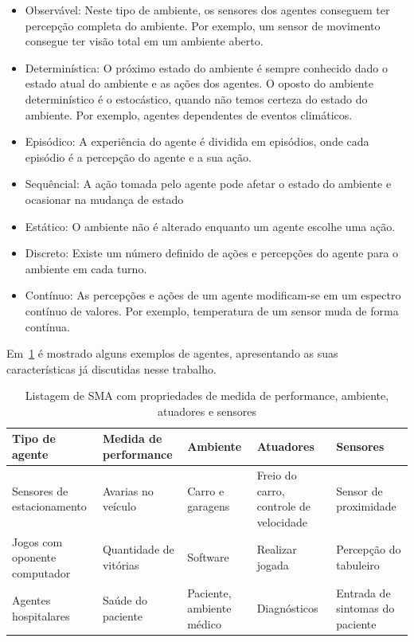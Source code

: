 \begin{itemize}
	\item Observável: Neste tipo de ambiente, os sensores dos agentes conseguem ter percepção completa do ambiente. Por exemplo, um sensor de movimento consegue ter visão total em um ambiente aberto.
	\item Determinística: O próximo estado do ambiente é sempre conhecido dado o estado atual do ambiente e as ações dos agentes. O oposto do ambiente determinístico é o estocástico, quando não temos certeza do estado do ambiente. Por exemplo, agentes dependentes de eventos climáticos.
	\item Episódico: A experiência do agente é dividida em episódios, onde cada episódio é a percepção do agente e a sua ação.
	\item Sequêncial: A ação tomada pelo agente pode afetar o estado do ambiente e ocasionar na mudança de estado
	\item Estático: O ambiente não é alterado enquanto um agente escolhe uma ação.
	\item Discreto: Existe um número definido de ações e percepções do agente para o ambiente em cada turno.
	\item Contínuo: As percepções e ações de um agente modificam-se em um espectro contínuo de valores. Por exemplo, temperatura de um sensor muda de forma contínua.
\end{itemize}

Em~\ref{lista_agentes} é mostrado alguns exemplos de agentes, apresentando as suas características já discutidas nesse trabalho.

\begin{table}
	\caption{Listagem de SMA com propriedades de medida de performance, ambiente, atuadores e sensores}
	\begin{tabular}{|p{3cm} | p{3cm} | p{2cm}| p{3cm} | p{3cm} |}
		\hline
		\textbf{Tipo de agente}	& \textbf{Medida de performance} & \textbf{Ambiente} & \textbf{Atuadores}  & \textbf{Sensores}	\\
		\hline
		Sensores de estacionamento	& Avarias no veículo & Carro e garagens & Freio do carro, controle de velocidade & Sensor de proximidade	\\
		\hline
		Jogos com oponente computador	& Quantidade de vitórias &	Software & Realizar jogada & Percepção do tabuleiro	\\
		\hline
		Agentes hospitalares		& Saúde do paciente & Paciente, ambiente médico & Diagnósticos & Entrada de sintomas do paciente	\\
		\hline
	\end{tabular}
	\label{lista_agentes}
\end{table}
 
